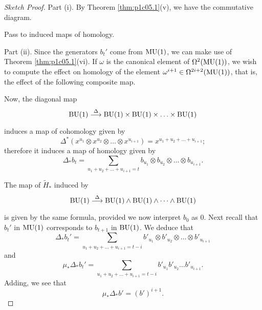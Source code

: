 \documentclass[../main]{subfiles}
\begin{document}
\begin{proof}[Sketch Proof]
Part (i). By Theorem \ref{thm:p1c05.1}(v), we have the commutative diagram. 

\begin{center}
\end{center}

Pass to induced maps of homology.

Part (ii). Since the generators $b_t'$ come from $\mathrm{MU}(1)$, we can make use of Theorem \ref{thm:p1c05.1}(vi). If $\omega$ is the canonical element of $\Omega^2(\mathrm{MU}(1))$, we wish to compute the effect on homology of the element $\omega^{i + 1} \in \Omega^{2i + 2} (\mathrm{MU}(1))$, that is, the effect of the following composite map.

\begin{center}
\end{center} 

Now, the diagonal map \[\te{BU}(1) \lar{\Delta} \te{BU}(1) \times \te{BU}(1) \times \ldots \times \te{BU}(1)\] induces a map of cohomology given by \[\Delta^\ast (x^{u_1} \otimes x^{u_2} \otimes \ldots \otimes x^{u_{i + 1}}) = x^{u_1 + u_2 + \ldots + u_{i + 1}};\] therefore it induces a map of homology given by \[\Delta_\ast b_t = \sum_{u_1 + u_2 + \ldots + u_{i + 1} = t} b_{u_1} \otimes b_{u_2} \otimes \ldots \otimes b_{u_{i + 1}}.\]

The map of ${\tilde H}_\ast$ induced by \[\te{BU}(1) \lar{\Delta} \te{BU}(1) \wedge \te{BU}(1) \wedge \cdots \wedge \te{BU}(1)\] is given by the same formula, provided we now interpret $b_0$ as $0$. Next recall that $b_t'$ in $\mathrm{MU}(1)$ corresponds to $b_{t + 1}$ in $\mathrm{BU}(1)$. We deduce that \[\Delta_\ast b_t' = \sum_{u_1 + u_2 + \ldots + u_{i + 1} = t - i} b'_{u_1} \otimes b'_{u_2} \otimes \ldots \otimes b'_{u_{i + 1}}\] and \[\mu_\ast \Delta_\ast b_t' = \sum_{u_1 + u_2 + \ldots + u_{i + 1} = t - i} b'_{u_1} b'_{u_2} \ldots b'_{u_{i + 1}}.\] Adding, we see that \[\mu_\ast \Delta_\ast b' = (b')^{i + 1}.\]


\end{proof}
\end{document}
